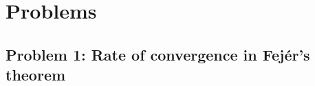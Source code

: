 \documentclass[12pt, reqno]{article}
\theoremstyle{definition}
\theoremstyle{remark}
\begin{document}
\newpage
\section{Problems} 

\subsection*{Problem 1: Rate of convergence in Fej\'er's theorem}


\end{document}

